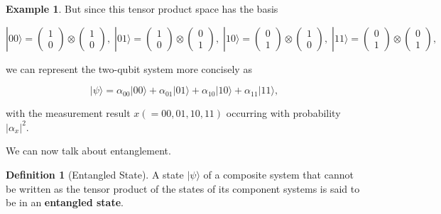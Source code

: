 \documentclass{article}
\theoremstyle{definition}
\newtheorem{example}{Example}[section]
\newtheorem{definition}{Definition}[section]
\begin{document}
\begin{example}
      But since this tensor product space has the basis

      \[
        |00\rangle = \begin{pmatrix} 1 \\ 0 \end{pmatrix} \otimes \begin{pmatrix} 1 \\ 0 \end{pmatrix}, \; 
        |01\rangle = \begin{pmatrix} 1 \\ 0 \end{pmatrix} \otimes \begin{pmatrix} 0 \\ 1 \end{pmatrix}, \; 
        |10\rangle = \begin{pmatrix} 0 \\ 1 \end{pmatrix} \otimes \begin{pmatrix} 1 \\ 0 \end{pmatrix}, \; 
        |11\rangle = \begin{pmatrix} 0 \\ 1 \end{pmatrix} \otimes \begin{pmatrix} 0 \\ 1 \end{pmatrix}, 
      \]

      we can represent the two-qubit system more concisely as

        \[|\psi \rangle = \alpha_{00} |00\rangle + \alpha_{01} |01\rangle + \alpha_{10} |10\rangle + \alpha_{11} |11\rangle,\]

      with the measurement result $x ( = 00, 01, 10, 11)$ occurring with probability $|\alpha_{x}|^2$.
    \end{example}

    We can now talk about entanglement. 

    \begin{definition}[Entangled State]
      A state $|\psi\rangle$ of a composite system that cannot be written as the tensor product of the states of its component systems is said to be in an \textbf{entangled state}.   
    \end{definition}
\end{document}
